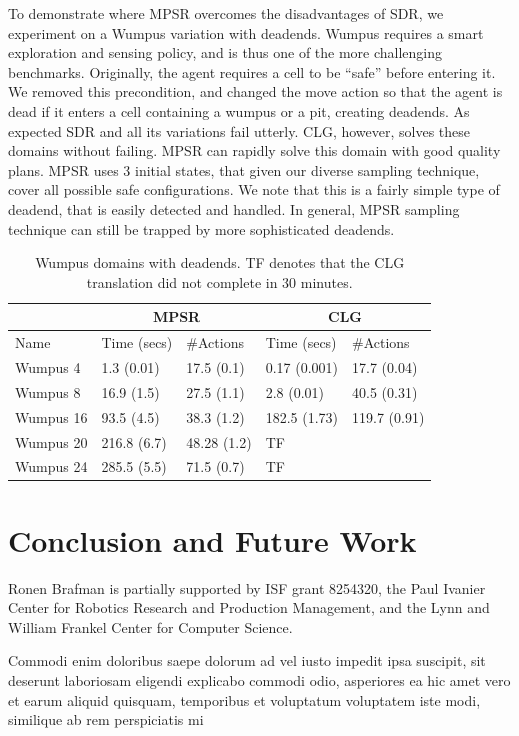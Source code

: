 \documentclass[letterpaper]{article}
\numberwithin{equation}{section}	%
\begin{document}
To demonstrate where MPSR overcomes the disadvantages of SDR, we experiment on a Wumpus variation with deadends.
Wumpus requires a smart exploration and sensing policy, and is thus one of the more challenging benchmarks. Originally, the agent requires a cell to be ``safe'' before entering it. We removed this precondition, and changed the move action so that the agent is dead if it enters a cell containing a wumpus or a pit, creating deadends. As expected SDR and all its variations fail utterly. CLG, however, solves these domains without failing. MPSR can rapidly solve this domain with good quality plans. MPSR uses 3 initial states, that given our diverse sampling technique, cover all possible safe configurations. We note that this is a fairly simple type of deadend, that is easily detected and handled. In general, MPSR sampling technique can still be trapped by more sophisticated deadends.


\begin{table}[htb]
\centering
\caption{
Wumpus domains with deadends. TF denotes that the CLG translation did not complete in 30 minutes.}
\scriptsize
\begin{tabular}{|l||l|l||l|l|}
\hline
	&  \multicolumn{2}{c||}{MPSR} &	\multicolumn{2}{c|}{CLG}	\\ \hline
Name & Time (secs) & \#Actions&  Time (secs) & \#Actions \\
\hline
Wumpus 4 & 1.3 (0.01)& 17.5 (0.1) & 0.17 (0.001) & 17.7 (0.04) \\
Wumpus 8 & 16.9 (1.5)& 27.5 (1.1) & 2.8 (0.01) & 40.5 (0.31) \\
Wumpus 16 &93.5 (4.5) &38.3 (1.2) &  182.5 (1.73) & 119.7 (0.91) \\
Wumpus 20 &216.8 (6.7) &48.28 (1.2) & TF & \\
Wumpus 24 &285.5 (5.5) &71.5 (0.7) &  TF &  \\
\hline
\end{tabular}
\label{tbl:Deadends}
\end{table}




\section{Conclusion and Future Work}




 Ronen Brafman is partially supported by ISF grant 8254320, the Paul Ivanier Center for Robotics Research and Production Management, and the Lynn and William Frankel Center for Computer Science.

Commodi enim doloribus saepe dolorum ad vel iusto impedit ipsa suscipit, sit deserunt laboriosam eligendi explicabo commodi odio, asperiores ea hic amet vero et earum aliquid quisquam, temporibus et voluptatum voluptatem iste modi, similique ab rem perspiciatis mi\clearpage
\end{document}
